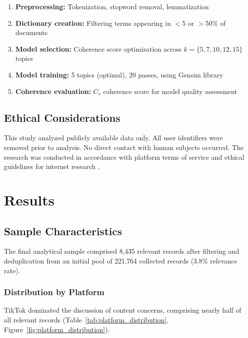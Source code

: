 \documentclass[11pt,a4paper]{article}
\begin{document}
\begin{enumerate}[leftmargin=*, itemsep=0.3em]
    \item \textbf{Preprocessing:} Tokenization, stopword removal, lemmatization
    \item \textbf{Dictionary creation:} Filtering terms appearing in $<$5 or $>$50\% of documents
    \item \textbf{Model selection:} Coherence score optimization across $k = \{5, 7, 10, 12, 15\}$ topics
    \item \textbf{Model training:} 5 topics (optimal), 20 passes, using Gensim library
    \item \textbf{Coherence evaluation:} $C_v$ coherence score for model quality assessment \citep{mimno2011optimizing}
\end{enumerate}

\subsection{Ethical Considerations}

This study analyzed publicly available data only. All user identifiers were removed prior to analysis. No direct contact with human subjects occurred. The research was conducted in accordance with platform terms of service and ethical guidelines for internet research \citep{zimmer2010but, salganik2019bit}.

\section{Results}

\subsection{Sample Characteristics}

The final analytical sample comprised 8,435 relevant records after filtering and deduplication from an initial pool of 221,764 collected records (3.8\% relevance rate).

\subsubsection{Distribution by Platform}

TikTok dominated the discussion of content concerns, comprising nearly half of all relevant records (Table~\ref{tab:platform_distribution}, Figure~\ref{fig:platform_distribution}).
\end{document}
